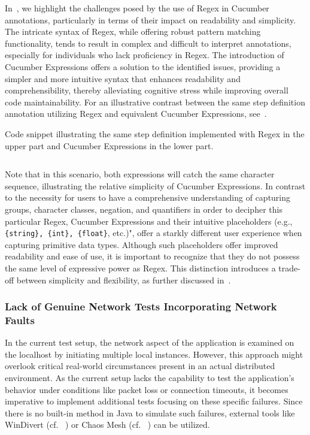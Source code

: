 In~, we highlight the challenges posed by the use of \ac{Regex} in Cucumber annotations, particularly in terms of their impact on readability and simplicity. The intricate syntax of \ac{Regex}, while offering robust pattern matching functionality, tends to result in complex and difficult to interpret annotations, especially for individuals who lack proficiency in \ac{Regex}. The introduction of Cucumber Expressions offers a solution to the identified issues, providing a simpler and more intuitive syntax that enhances readability and comprehensibility, thereby alleviating cognitive stress while improving overall code maintainability. For an illustrative contrast between the same step definition annotation utilizing \ac{Regex} and equivalent Cucumber Expressions, see~.

\begin{listing}[!ht]
\caption{Code snippet illustrating the same step definition implemented with \ac{Regex} in the upper part and Cucumber Expressions in the lower part.}
\label{lst:simpleRegex}
\inputminted{java}{files/code/simpleRegex.java}
\end{listing}

Note that in this scenario, both expressions will catch the same character sequence, illustrating the relative simplicity of Cucumber Expressions. In contrast to the necessity for users to have a comprehensive understanding of capturing groups, character classes, negation, and quantifiers in order to decipher this particular \ac{Regex}, Cucumber Expressions and their intuitive placeholders (e.g., \verb|{string}, {int}, {float}|, etc.)", offer a starkly different user experience when capturing primitive data types. Although such placeholders offer improved readability and ease of use, it is important to recognize that they do not possess the same level of expressive power as \ac{Regex}. This distinction introduces a trade-off between simplicity and flexibility, as further discussed in~. 


\subsubsection{Lack of Genuine Network Tests Incorporating Network Faults}
\label{sub:lack-network-tests}

In the current test setup, the network aspect of the application is examined on the localhost by initiating multiple local instances. However, this approach might overlook critical real-world circumstances present in an actual distributed environment. As the current setup lacks the capability to test the application's behavior under conditions like packet loss or connection timeouts, it becomes imperative to implement additional tests focusing on these specific failures. Since there is no built-in method in Java to simulate such failures, external tools like WinDivert (cf. ~) or Chaos Mesh (cf. ~) can be utilized.

